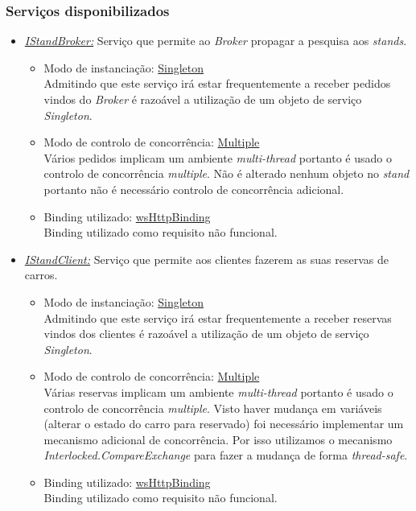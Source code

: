 \documentclass[a4paper]{article}
\begin{document}
\subsubsection{Serviços disponibilizados}
\begin{itemize} 

\item
\emph{\underline{IStandBroker:}}
Serviço que permite ao \emph{Broker} propagar a pesquisa aos \emph{stands}.
	\begin{itemize}
		\item
		Modo de instanciação: \underline{Singleton}\\
		Admitindo que este serviço irá estar frequentemente a receber pedidos vindos do \emph{Broker} é razoável a utilização de um objeto de serviço \emph{Singleton}.
		\item
		Modo de controlo de concorrência: \underline{Multiple}\\
		Vários pedidos implicam um ambiente \emph{multi-thread} portanto é usado o controlo de concorrência \emph{multiple}.
		Não é alterado nenhum objeto no \emph{stand} portanto não é necessário controlo de concorrência adicional.
		\item
		Binding utilizado: \underline{wsHttpBinding}\\
		Binding utilizado como requisito não funcional.
	\end{itemize}
	
	\item
\emph{\underline{IStandClient:}}
Serviço que permite aos clientes fazerem as suas reservas de carros.
	\begin{itemize}
		\item
		Modo de instanciação: \underline{Singleton}\\
		Admitindo que este serviço irá estar frequentemente a receber reservas vindos dos clientes é razoável a utilização de um objeto de serviço \emph{Singleton}.
		\item
		Modo de controlo de concorrência: \underline{Multiple}\\
		Várias reservas implicam um ambiente \emph{multi-thread} portanto é usado o controlo de concorrência \emph{multiple}. Visto haver mudança em variáveis (alterar o estado do carro para reservado) foi necessário implementar um mecanismo adicional de concorrência. Por isso utilizamos o mecanismo \emph{Interlocked.CompareExchange} para fazer a mudança de forma \emph{thread-safe}.
		\item
		Binding utilizado: \underline{wsHttpBinding}\\
		Binding utilizado como requisito não funcional.
	\end{itemize}
	
\end{itemize}
\end{document}
